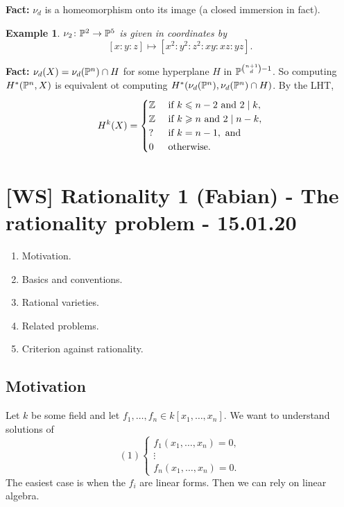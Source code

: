 \documentclass[A4paper, british]{amsart}
\theoremstyle{darkgreentheorem}
\theoremstyle{darkbluedefinition}
\theoremstyle{darkredexample}
\newtheorem{exa}[thm]{Example}
\theoremstyle{remark}
\newcommand{\1}{\mathbbm{1}}
\begin{document}
\textbf{Fact:}
$\nu_{d}$ is a homeomorphism onto its image (a closed immersion in fact).

\begin{exa}
    $\nu_{2}\colon \P^{2}\to \P^{5}$ is given in coordinates by
    \[ [x:y:z]\mapsto [x^{2}:y^{2}:z^{2}:xy:xz:yz]. \]
\end{exa}

\textbf{Fact:}
$\nu_{d}(X)=\nu_{d}(\P^{n})\cap H$ for some hyperplane $H$ in $\P^{{{n+1}\choose{d}}-1}$.
So computing $H^{*}(\P^{n},X)$ is equivalent ot computing $H^{*}(\nu_{d}(\P^{n}),\nu_{d}(\P^{n})\cap H)$.
By the LHT,
\[ H^{k}(X)=\begin{cases}
    \Z & \text{ if } k\leqslant n-2 \text{ and } 2\mid k, \\
    \Z & \text{ if } k\geqslant n \text{ and } 2\mid n-k, \\
    ? & \text{ if } k=n-1, \text{ and} \\
    0 & \text{ otherwise.}
\end{cases}
\]

\section{[WS] Rationality 1 (Fabian) - The rationality problem - 15.01.20}

\begin{enumerate}
    \item Motivation.
    \item Basics and conventions.
    \item Rational varieties.
    \item Related problems.
    \item Criterion against rationality.
\end{enumerate}

\subsection{Motivation}

Let $k$ be some field and let $f_{1},\ldots,f_{n}\in k[x_{1},\ldots,x_{n}]$.
We want to understand solutions of
\[ (1)\begin{cases}
    f_{1}(x_{1},\ldots,x_{n})=0, \\
    \vdots \\
    f_{n}(x_{1},\ldots,x_{n})=0.
\end{cases}
\]
The easiest case is when the $f_{i}$ are linear forms.
Then we can rely on linear algebra.
\end{document}
